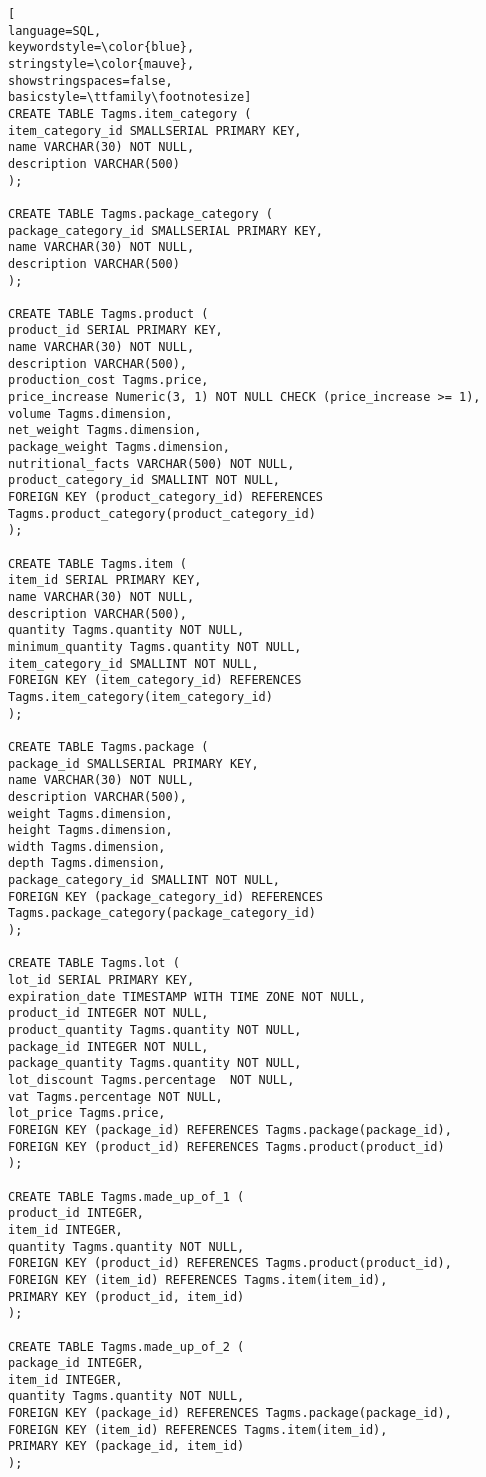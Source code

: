 \begin{lstlisting}[
language=SQL,
keywordstyle=\color{blue},
stringstyle=\color{mauve},
showstringspaces=false,
basicstyle=\ttfamily\footnotesize]
CREATE TABLE Tagms.item_category (
item_category_id SMALLSERIAL PRIMARY KEY,
name VARCHAR(30) NOT NULL,
description VARCHAR(500)
);

CREATE TABLE Tagms.package_category (
package_category_id SMALLSERIAL PRIMARY KEY,
name VARCHAR(30) NOT NULL,
description VARCHAR(500)
);

CREATE TABLE Tagms.product (
product_id SERIAL PRIMARY KEY,
name VARCHAR(30) NOT NULL,
description VARCHAR(500),
production_cost Tagms.price,
price_increase Numeric(3, 1) NOT NULL CHECK (price_increase >= 1),
volume Tagms.dimension,
net_weight Tagms.dimension,
package_weight Tagms.dimension,
nutritional_facts VARCHAR(500) NOT NULL,
product_category_id SMALLINT NOT NULL,
FOREIGN KEY (product_category_id) REFERENCES Tagms.product_category(product_category_id)
);

CREATE TABLE Tagms.item (
item_id SERIAL PRIMARY KEY,
name VARCHAR(30) NOT NULL,
description VARCHAR(500),
quantity Tagms.quantity NOT NULL,
minimum_quantity Tagms.quantity NOT NULL,
item_category_id SMALLINT NOT NULL,
FOREIGN KEY (item_category_id) REFERENCES Tagms.item_category(item_category_id)
);

CREATE TABLE Tagms.package (
package_id SMALLSERIAL PRIMARY KEY,
name VARCHAR(30) NOT NULL,
description VARCHAR(500),
weight Tagms.dimension,
height Tagms.dimension,
width Tagms.dimension,
depth Tagms.dimension,
package_category_id SMALLINT NOT NULL,
FOREIGN KEY (package_category_id) REFERENCES Tagms.package_category(package_category_id)
);

CREATE TABLE Tagms.lot (
lot_id SERIAL PRIMARY KEY,
expiration_date TIMESTAMP WITH TIME ZONE NOT NULL,
product_id INTEGER NOT NULL,
product_quantity Tagms.quantity NOT NULL,
package_id INTEGER NOT NULL,
package_quantity Tagms.quantity NOT NULL,
lot_discount Tagms.percentage  NOT NULL,
vat Tagms.percentage NOT NULL,
lot_price Tagms.price,
FOREIGN KEY (package_id) REFERENCES Tagms.package(package_id),
FOREIGN KEY (product_id) REFERENCES Tagms.product(product_id)
);

CREATE TABLE Tagms.made_up_of_1 (
product_id INTEGER,
item_id INTEGER,
quantity Tagms.quantity NOT NULL,
FOREIGN KEY (product_id) REFERENCES Tagms.product(product_id),
FOREIGN KEY (item_id) REFERENCES Tagms.item(item_id),
PRIMARY KEY (product_id, item_id)
);

CREATE TABLE Tagms.made_up_of_2 (
package_id INTEGER,
item_id INTEGER,
quantity Tagms.quantity NOT NULL,
FOREIGN KEY (package_id) REFERENCES Tagms.package(package_id),
FOREIGN KEY (item_id) REFERENCES Tagms.item(item_id),
PRIMARY KEY (package_id, item_id)
);


\end{lstlisting}
